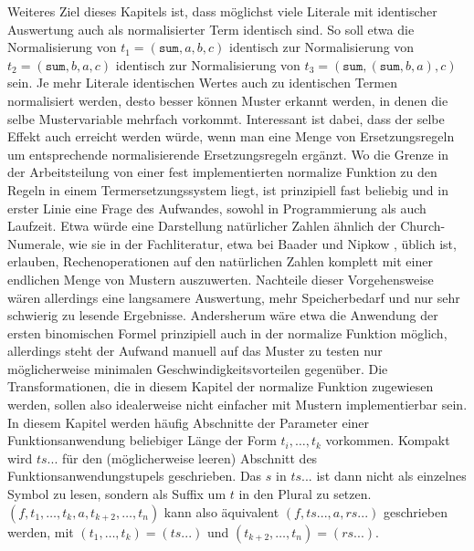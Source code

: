 \documentclass{scrartcl}
\numberwithin{figure}{section} %
\theoremstyle{definition} %
\newcommand{\elems}[3]{{#1}_{#2}, \dots, {#1}_{#3}}
\begin{document}
Weiteres Ziel dieses Kapitels ist, dass möglichst viele Literale mit identischer Auswertung auch als normalisierter Term identisch sind. So soll etwa die Normalisierung von $t_1 = (\texttt{sum}, a, b, c)$ identisch zur Normalisierung von $t_2 = (\texttt{sum}, b, a, c)$ identisch zur Normalisierung von $t_3 = (\texttt{sum}, (\texttt{sum}, b, a), c)$ sein. Je mehr Literale identischen Wertes auch zu identischen Termen normalisiert werden, desto besser können Muster erkannt werden, in denen die selbe Mustervariable mehrfach vorkommt. Interessant ist dabei, dass der selbe Effekt auch erreicht werden würde, wenn man eine Menge von Ersetzungsregeln um entsprechende normalisierende Ersetzungsregeln ergänzt. Wo die Grenze in der Arbeitsteilung von einer fest implementierten $\mathrm{normalize}$ Funktion zu den Regeln in einem Termersetzungssystem liegt, ist prinzipiell fast beliebig und in erster Linie eine Frage des Aufwandes, sowohl in Programmierung als auch Laufzeit. Etwa würde eine Darstellung natürlicher Zahlen ähnlich der Church-Numerale, wie sie in der Fachliteratur, etwa bei Baader und Nipkow \cite{baader_nipkow_1998}, üblich ist, erlauben, Rechenoperationen auf den natürlichen Zahlen komplett mit einer endlichen Menge von Mustern auszuwerten. Nachteile dieser Vorgehensweise wären allerdings eine langsamere Auswertung, mehr Speicherbedarf und nur sehr schwierig zu lesende Ergebnisse. Andersherum wäre etwa die Anwendung der ersten binomischen Formel prinzipiell auch in der $\mathrm{normalize}$ Funktion möglich, allerdings steht der Aufwand manuell  auf das Muster zu testen nur möglicherweise minimalen Geschwindigkeitsvorteilen gegenüber. Die Transformationen, die in diesem Kapitel der $\mathrm{normalize}$ Funktion zugewiesen werden, sollen also idealerweise nicht einfacher mit Mustern implementierbar sein.\\

In diesem Kapitel werden häufig Abschnitte der Parameter einer Funktionsanwendung beliebiger Länge der Form $\elems t i k$ vorkommen. Kompakt wird $ts...$ für den (möglicher\-weise leeren) Abschnitt des Funktionsanwendungstupels geschrieben. Das $s$ in $ts...$ ist dann nicht als einzelnes Symbol zu lesen, sondern als Suffix um $t$ in den Plural zu setzen. \\$(f, \elems t 1 k, a, \elems t {k+2} n)$ kann also äquivalent $(f, ts..., a, rs...)$ geschrieben werden, mit $(\elems t 1 k) = (ts...)$ und $(\elems t {k+2} n) = (rs...)$.\\
\end{document}
